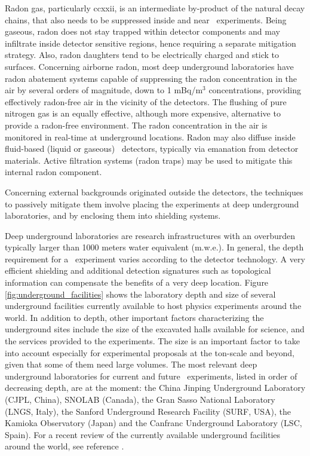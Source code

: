 Radon gas, particularly \Rn{222}, is an intermediate by-product of the natural decay chains, that also needs to be suppressed inside and near \bbonu\ experiments. Being gaseous, radon does not stay trapped within detector components and may infiltrate inside detector sensitive regions, hence requiring a separate mitigation strategy. Also, radon daughters tend to be electrically charged and stick to surfaces. Concerning airborne radon, most deep underground laboratories have radon abatement systems capable of suppressing the radon concentration in the air by several orders of magnitude, down to 1 mBq/m$^3$ concentrations, providing effectively radon-free air in the vicinity of the detectors. The flushing of pure nitrogen gas is an equally effective, although more expensive, alternative to provide a radon-free environment. The radon concentration in the air is monitored in real-time at underground locations. Radon may also diffuse inside fluid-based (liquid or gaseous) \bbonu\ detectors, typically via emanation from detector materials. Active filtration systems (radon traps) may be used to mitigate this internal radon component.

Concerning external backgrounds originated outside the detectors, the techniques to passively mitigate them involve placing the experiments at deep underground laboratories, and by enclosing them into shielding systems. 

Deep underground laboratories are research infrastructures with an overburden typically larger than 1000 meters water equivalent (m.w.e.). In general, the depth requirement for a \bbonu\ experiment varies according to the detector technology. A very efficient shielding and additional detection signatures such as topological information can compensate the benefits of a very deep location. Figure \ref{fig:underground_facilities} shows the laboratory depth and size of several underground facilities currently available to host physics experiments around the world. In addition to depth, other important factors characterizing the underground sites include the size of the excavated halls available for science, and the services provided to the experiments. The size is an important factor to take into account especially for experimental proposals at the ton-scale and beyond, given that some of them need large volumes. The most relevant deep underground laboratories for current and future \bbonu\ experiments, listed in order of decreasing depth, are at the moment: the China Jinping Underground Laboratory (CJPL, China), SNOLAB (Canada), the Gran Sasso National Laboratory (LNGS, Italy), the Sanford Underground Research Facility (SURF, USA), the Kamioka Observatory (Japan) and the Canfranc Underground Laboratory (LSC, Spain). For a recent review of the currently available underground facilities around the world, see reference \cite{Ianni:2023fvs}. 


